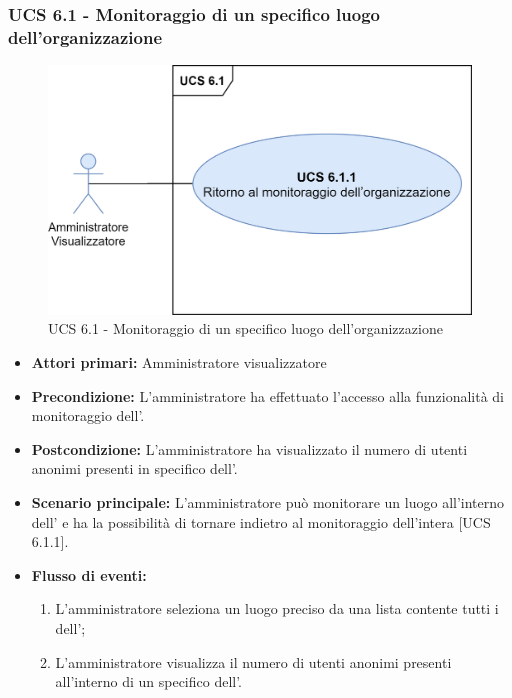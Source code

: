 \subsubsection{UCS 6.1 - Monitoraggio di un specifico luogo dell'organizzazione}

\begin{figure}[h]
	\centering
    \includegraphics[scale=0.50]{Sezioni/UseCase/Immagini/UCS6.1.png}
    \caption{UCS 6.1 - Monitoraggio di un specifico luogo dell'organizzazione}
\end{figure}

\begin{itemize}
	\item \textbf{Attori primari:} Amministratore visualizzatore
	\item \textbf{Precondizione:} L'amministratore ha effettuato l'accesso alla funzionalità di monitoraggio dell'.
	\item \textbf{Postcondizione:} L'amministratore ha visualizzato il numero di utenti anonimi presenti in specifico  dell'.
	\item \textbf{Scenario principale:} L'amministratore può monitorare un luogo all'interno dell' e ha la possibilità di tornare indietro al monitoraggio dell'intera  [UCS 6.1.1].
	\item \textbf{Flusso di eventi:}
	\begin{enumerate}
	\item L'amministratore seleziona un luogo preciso da una lista contente tutti i  dell';
	\item L'amministratore visualizza il numero di utenti anonimi presenti all'interno di un specifico  dell'.
	\end{enumerate}
\end{itemize}


